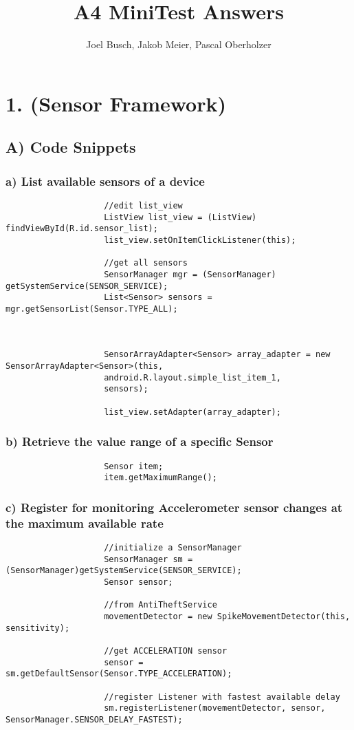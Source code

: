 \documentclass[10pt,a4paper]{report}
\title{A4 MiniTest Answers}
\author{Joel Busch, Jakob Meier, Pascal Oberholzer}
\begin{document}
	\maketitle
	
	\section*{1. (Sensor Framework)}
		\subsection*{A) Code Snippets}
			\subsubsection*{a) List available sensors of a device}
				\begin{lstlisting}
					//edit list_view
					ListView list_view = (ListView) findViewById(R.id.sensor_list);
					list_view.setOnItemClickListener(this);
					
					//get all sensors
					SensorManager mgr = (SensorManager) getSystemService(SENSOR_SERVICE);
					List<Sensor> sensors = mgr.getSensorList(Sensor.TYPE_ALL);
					
					
					
					SensorArrayAdapter<Sensor> array_adapter = new SensorArrayAdapter<Sensor>(this,
					android.R.layout.simple_list_item_1,
					sensors);
					
					list_view.setAdapter(array_adapter);
				\end{lstlisting}

			\subsubsection*{b) Retrieve the value range of a specific Sensor}
				\begin{lstlisting}
					Sensor item;
					item.getMaximumRange();
				\end{lstlisting}

			\subsubsection*{c) Register for monitoring Accelerometer sensor changes at the maximum available rate}
				\begin{lstlisting}
					//initialize a SensorManager
					SensorManager sm = (SensorManager)getSystemService(SENSOR_SERVICE);
					Sensor sensor;
					
					//from AntiTheftService
					movementDetector = new SpikeMovementDetector(this, sensitivity);
					
					//get ACCELERATION sensor
					sensor = sm.getDefaultSensor(Sensor.TYPE_ACCELERATION);
					
					//register Listener with fastest available delay
					sm.registerListener(movementDetector, sensor, SensorManager.SENSOR_DELAY_FASTEST);
				\end{lstlisting}
				
\end{document}
